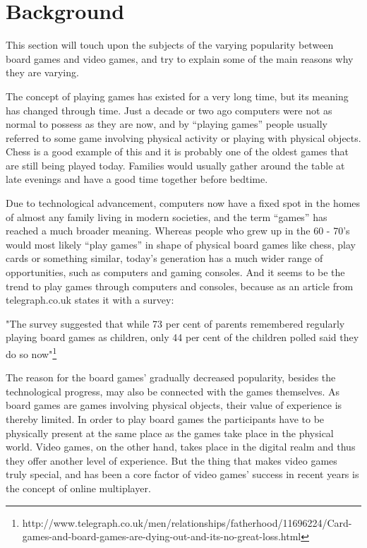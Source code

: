 
\section{Background}

This section will touch upon the subjects of the varying popularity between
 board games and video games, and try to explain some of the main reasons why
 they are varying.\newline

The concept of playing games has existed for a very long time, but its meaning
 has changed through time. Just a decade or two ago computers were not as
 normal to possess as they are now, and by “playing games” people usually
 referred to some game involving physical activity or playing with physical
  objects. Chess is a good example of this and it is probably one of the
  oldest games that are still being played today.
Families would usually gather around the table at late evenings and have a
good time together before bedtime.\newline

Due to technological advancement, computers now have a fixed spot in the
 homes of almost any family living in modern societies, and the term “games”
 has reached a much broader meaning. Whereas people who grew up in the
  60 - 70’s would most likely “play games” in shape of physical board
  games like chess, play cards or something similar, today’s generation
  has a much wider range of opportunities, such as computers and gaming
   consoles. And it seems to be the trend to play games through computers
    and consoles, because as an article from telegraph.co.uk states it with
     a survey:\newline

"The survey suggested that while 73 per cent of parents remembered regularly
 playing board games as children, only 44 per cent of the children polled said
 they do so now"\footnote{http://www.telegraph.co.uk/men/relationships/fatherhood/11696224/Card-games-and-board-games-are-dying-out-and-its-no-great-loss.html}\newline

The reason for the board games' gradually decreased popularity, besides
 the technological progress, may also be connected with the games themselves.
  As board games are games involving physical objects, their value of
   experience is thereby limited. In order to play board games the participants
   have to be physically present at the same place as the games take place in
   the physical world. Video games, on the other hand, takes place in the
   digital realm and thus they offer another level of experience. But the
   thing that makes video games truly special, and has been a core factor
   of video games’ success in recent years is the concept of online
    multiplayer.\newline

